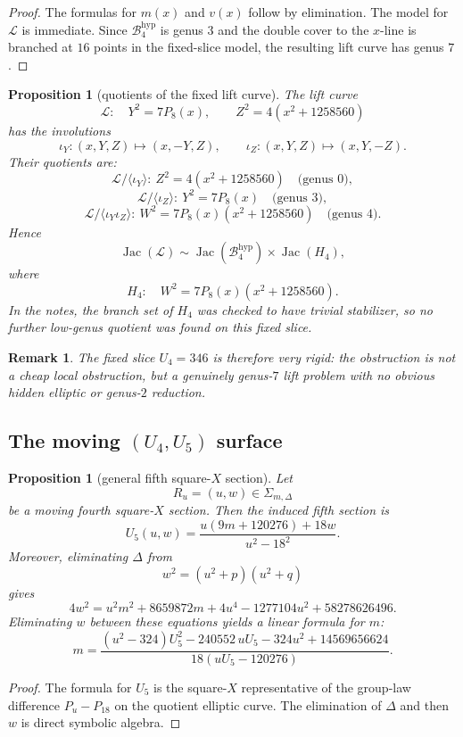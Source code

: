\documentclass[11pt]{article}
\theoremstyle{plainbreak}
\newtheorem{proposition}[theorem]{Proposition}
\theoremstyle{defbreak}
\newtheorem{remark}[theorem]{Remark}
\DeclareMathOperator{\Jac}{Jac}
\begin{document}
\begin{proof}
The formulas for $m(x)$ and $v(x)$ follow by elimination.  The model for $\mathcal L$ is immediate.  Since $\mathcal B_4^{\mathrm{hyp}}$ is genus $3$ and the double cover to the $x$-line is branched at $16$ points in the fixed-slice model, the resulting lift curve has genus $7$.
\end{proof}

\begin{proposition}[quotients of the fixed lift curve]
The lift curve
\[
\mathcal L:\quad
Y^2=7P_8(x),\qquad Z^2=4(x^2+1258560)
\]
has the involutions
\[
\iota_Y:(x,Y,Z)\mapsto (x,-Y,Z),\qquad
\iota_Z:(x,Y,Z)\mapsto (x,Y,-Z).
\]
Their quotients are:
\[
\mathcal L/\langle \iota_Y\rangle:\ Z^2=4(x^2+1258560)
\quad\text{(genus $0$)},
\]
\[
\mathcal L/\langle \iota_Z\rangle:\ Y^2=7P_8(x)
\quad\text{(genus $3$)},
\]
\[
\mathcal L/\langle \iota_Y\iota_Z\rangle:\ W^2=7P_8(x)(x^2+1258560)
\quad\text{(genus $4$)}.
\]
Hence
\[
\Jac(\mathcal L)\sim \Jac(\mathcal B_4^{\mathrm{hyp}})\times \Jac(H_4),
\]
where
\[
H_4:\quad W^2=7P_8(x)(x^2+1258560).
\]
In the notes, the branch set of $H_4$ was checked to have trivial stabilizer, so no further low-genus quotient was found on this fixed slice.
\end{proposition}

\begin{remark}
The fixed slice $U_4=346$ is therefore very rigid: the obstruction is not a cheap local obstruction, but a genuinely genus-$7$ lift problem with no obvious hidden elliptic or genus-$2$ reduction.
\end{remark}

\subsection{The moving $(U_4,U_5)$ surface}

\begin{proposition}[general fifth square-$X$ section]
Let
\[
R_u=(u,w)\in \Sigma_{m,\Delta}
\]
be a moving fourth square-$X$ section. Then the induced fifth section is
\[
U_5(u,w)=\frac{u(9m+120276)+18w}{u^2-18^2}.
\]
Moreover, eliminating $\Delta$ from
\[
w^2=(u^2+p)(u^2+q)
\]
gives
\[
4w^2=u^2m^2+8659872m+4u^4-1277104u^2+58278626496.
\]
Eliminating $w$ between these equations yields a linear formula for $m$:
\[
m=
\frac{(u^2-324)U_5^2-240552\,uU_5-324u^2+14569656624}
{18(uU_5-120276)}.
\]
\end{proposition}

\begin{proof}
The formula for $U_5$ is the square-$X$ representative of the group-law difference $P_u-P_{18}$ on the quotient elliptic curve.  The elimination of $\Delta$ and then $w$ is direct symbolic algebra.
\end{proof}
\end{document}
